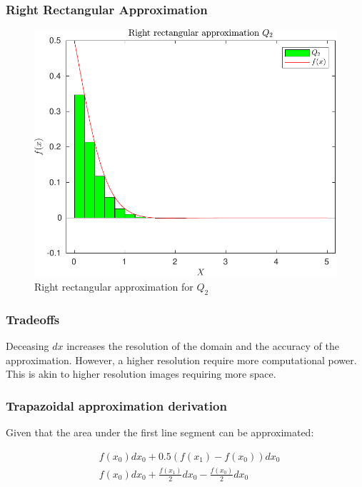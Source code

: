\documentclass[12pt, a4paper]{article}
\begin{document}
			\subsubsection{Right Rectangular Approximation}
				
				
				\begin{figure}[H]
					\centering
					\includegraphics[width=1\linewidth]{Code/Fig/q2_bar_plot.pdf}
					\caption{\Large Right rectangular approximation for $Q_{2}$}
					\label{fig:q2barplot}
				\end{figure}	
						
			\subsubsection{Tradeoffs}
			Deceasing $dx$ increases the resolution of the domain and the accuracy of the approximation. However, a higher resolution require more computational power. This is akin to higher resolution images requiring more space.
			\subsubsection{Trapazoidal approximation derivation}
				Given that the area under the first line segment can be approximated:
				
				$$
				\begin{aligned}
					& f\left(x_{0}\right) d x_{0}+0.5\left(f\left(x_{1}\right)-f\left(x_{0}\right)\right) d x_{0} \\
					& f\left(x_{0}\right) d x_{0}+\frac{f\left(x_{1}\right)}{2} d x_{0}-\frac{f\left(x_{0}\right)}{2} d x_{0}
				\end{aligned}
				$$
				
\end{document}
